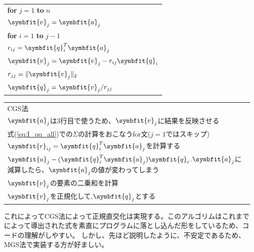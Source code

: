 \begin{tcolorbox}[colframe=black!80,colback=white,title=Claasical Gram--Schmidt Algorithm (unstable)]
\begin{minipage}[t]{0.34\textwidth}
\begin{table}[H]\centering
    \begin{tabular}{l}
        \textbf{for} $j=1$ \textbf{to} $n$\\
        \hspace{0.8cm} $\symbfit{v}_j=\symbfit{a}_j$\\
        \hspace{0.8cm} \textbf{for} $i=1$ \textbf{to} $j-1$\\
        \hspace{1.6cm} $r_{ij}=\symbfit{q}^T_i\symbfit{a}_j$\\
        \hspace{1.6cm} $\symbfit{v}_j=\symbfit{v}_j - r_{ij}\symbfit{q}_i$\\
        \hspace{0.8cm} $r_{jj}=\|\symbfit{v}_j\|_2$\\
        \hspace{0.8cm} $\symbfit{q}_j = \symbfit{v}_j/r_{jj}$
    \end{tabular}
\end{table}
\end{minipage}\hfill
\begin{minipage}[t]{0.65\textwidth}
    \bigskip
    \begin{tabular}[H]{|l}
        CGS法 \\
        $\symbfit{a}_j$は3行目で使うため、$\symbfit{v}_j$に結果を反映させる \\
        式(\ref{eq:I_qq_all})での$\Sigma$の計算をおこなうfor文($j=1$ではスキップ)\\
        $\symbfit{r}_{ij}=\symbfit{q}_i^T\symbfit{a}_j$を計算する\\
        $\symbfit{a}_j - (\symbfit{q}_i^T\symbfit{a}_j)\symbfit{q}_i$.$\symbfit{a}_j$に減算したら、$\symbfit{a}_j$の値が変わってしまう\\
        $\symbfit{v}_j$の要素の二乗和を計算\\
        $\symbfit{v}_j$を正規化して,$\symbfit{q}_j$とする
    \end{tabular}
    \bigskip
\end{minipage}
\end{tcolorbox}
これによってCGS法によって正規直交化は実現する。このアルゴリムはこれまでによって導出された式を素直にプログラムに落とし込んだ形をしているため、コードの理解がしやすい。
しかし、先ほど説明したように、不安定であるため、MGS法で実装する方が好ましい。
